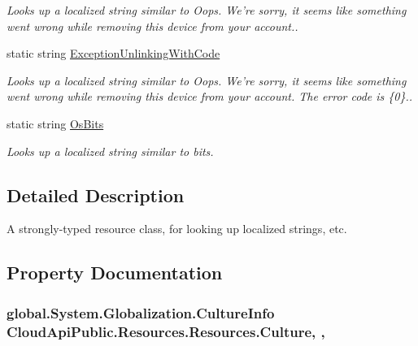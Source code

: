 \begin{DoxyCompactItemize}
\begin{DoxyCompactList}\small\item\em Looks up a localized string similar to Oops. We're sorry, it seems like something went wrong while removing this device from your account.. \end{DoxyCompactList}\item 
static string \hyperlink{class_cloud_api_public_1_1_resources_1_1_resources_a469d7e53ae6aa81528b38ea8f5758890}{Exception\-Unlinking\-With\-Code}
\begin{DoxyCompactList}\small\item\em Looks up a localized string similar to Oops. We're sorry, it seems like something went wrong while removing this device from your account. The error code is \{0\}.. \end{DoxyCompactList}\item 
static string \hyperlink{class_cloud_api_public_1_1_resources_1_1_resources_a998c59aa83300bbd83ad7f6c6c4e9b0b}{Os\-Bits}
\begin{DoxyCompactList}\small\item\em Looks up a localized string similar to bits. \end{DoxyCompactList}\end{DoxyCompactItemize}


\subsection{Detailed Description}
A strongly-\/typed resource class, for looking up localized strings, etc. 



\subsection{Property Documentation}
\hypertarget{class_cloud_api_public_1_1_resources_1_1_resources_afcce1e8e34c06f6d15a43d3936a1aa18}{
\subsubsection[{Culture}]{\setlength{\rightskip}{0pt plus 5cm}global.\-System.\-Globalization.\-Culture\-Info Cloud\-Api\-Public.\-Resources.\-Resources.\-Culture\hspace{0.3cm}{\ttfamily [static]}, {\ttfamily [get]}, {\ttfamily [set]}}}\label{class_cloud_api_public_1_1_resources_1_1_resources_afcce1e8e34c06f6d15a43d3936a1aa18}


